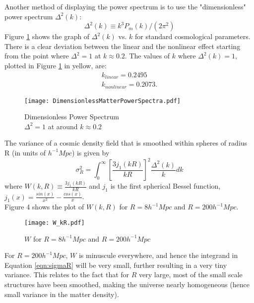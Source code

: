\documentclass[11pt, letterpaper, twoside]{article}
\begin{document}
Another method of displaying the power spectrum is to use the "dimensionless" power spectrum $\Delta^2(k)$:
\begin{equation}
    \Delta^2(k) \equiv k^3 P_m(k) / (2\pi^2)
\end{equation}
Figure \ref{fig:powerspectrum_dimensionless} shows the graph of $\Delta^2(k)$ vs. $k$ for standard cosmological parameters. There is a clear deviation between the linear and the nonlinear effect starting from the point where $\Delta^2 = 1$ at $k\approx0.2$. The values of $k$ where $\Delta^2(k) = 1$, plotted in Figure \ref{fig:powerspectrum_dimensionless} in yellow, are:
\begin{align*}
    k_{linear} = 0.2495 \\
    k_{nonlinear} = 0.2073.
\end{align*}

\begin{figure}[h!]
    \centering
    \texttt{[image: DimensionlessMatterPowerSpectra.pdf]}
    \caption{Dimensionless Power Spectrum\\$\Delta^2 = 1$ at around $k \approx 0.2$}
    \label{fig:powerspectrum_dimensionless}
\end{figure}

The variance of a cosmic density field that is smoothed within spheres of radius R (in units of $h^{-1} Mpc$) is given by
\begin{equation}
    \sigma^2_R = \int^\infty_0 \left[ \frac{3j_1(kR)}{kR}\right]^2 \frac{\Delta^2(k)}{k} dk
    \label{eqn:sigmaR}
\end{equation}
where $W(k,R) \equiv \frac{3j_1(kR)}{kR}$ and $j_1$ is the first spherical Bessel function, $j_1(x) = \frac{sin(x)}{x^2} - \frac{cos(x)}{x}$.\\
Figure 4 shows the plot of $W(k,R)$ for $R = 8 h^{-1} Mpc$ and $R = 200 h^{-1} Mpc$.

\begin{figure}[h!]
    \centering
    \texttt{[image: W\_kR.pdf]}
    \caption{$W$ for $R = 8 h^{-1} Mpc$ and $R = 200 h^{-1} Mpc$}
    \label{fig:W_kR}
\end{figure}
\noindent
For $R = 200 h^{-1} Mpc$, $W$ is minuscule everywhere, and hence the integrand in Equation \ref{eqn:sigmaR} will be very small, further resulting in a very tiny variance. This relates to the fact that for $R$ very large, most of the small scale structures have been smoothed, making the universe nearly homogeneous (hence small variance in the matter density). \\\\
\end{document}
